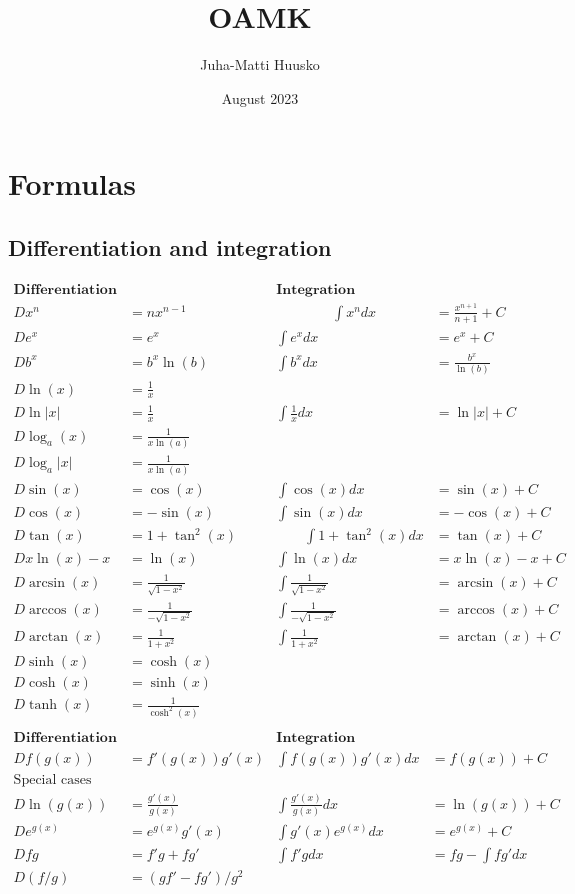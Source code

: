 \documentclass[12pt]{article}
\title{OAMK}
\author{Juha-Matti Huusko}
\date{August 2023}
\begin{document}
\thispagestyle{empty}

\section*{Formulas}
\subsection*{Differentiation and integration}

$$
\begin{array}{rl|rl}
\textbf{Differentiation} && \textbf{Integration}&\\[2mm]
Dx^n&=nx^{n-1}     \qquad\qquad&\qquad\qquad\int x^ndx&=\frac{x^{n+1}}{n+1}+C \\[2mm]
De^x&=e^x &\int e^xdx&=e^x+C\\[2mm]
Db^x&=b^x\ln(b) & \int b^xdx&=\frac{b^x}{\ln(b)}\\[2mm]
D\ln(x)&=\frac{1}{x} &&\\[2mm]
D\ln|x|&=\frac{1}{x} &\int\frac{1}{x}dx&=\ln|x|+C\\[2mm]
D\log_a(x)&=\frac{1}{x\ln(a)} &&\\[2mm]
D\log_a|x|&=\frac{1}{x\ln(a)} &&\\[2mm]
D\sin(x)&=\cos(x)   &\int\cos(x)dx&=\sin(x)+C\\[2mm]
D\cos(x)&=-\sin(x)  &\int\sin(x)dx&=-\cos(x)+C\\[2mm]
D\tan(x)&=1+\tan^2(x) \qquad&\qquad\int 1+\tan^2(x)dx&=\tan(x)+C\\[2mm]

Dx\ln(x)-x&=\ln(x) & \int\ln(x)dx&=x\ln(x)-x+C\\[10mm]

D\arcsin(x)&=\frac{1}{\sqrt{1-x^2}} & \int\frac{1}{\sqrt{1-x^2}}&=\arcsin(x)+C\\
D\arccos(x)&=\frac{1}{-\sqrt{1-x^2}} & \int\frac{1}{-\sqrt{1-x^2}}&=\arccos(x)+C\\
D\arctan(x)&=\frac{1}{1+x^2} & \int\frac{1}{1+x^2}&=\arctan(x)+C\\

D\sinh(x)&=\cosh(x) &&\\
D\cosh(x)&=\sinh(x) &&\\
D\tanh(x)&=\frac{1}{\cosh^2(x)} &&\\
\end{array}  
$$
\vspace{1cm}
$$
\begin{array}{rl|rl}
\textbf{Differentiation} && \textbf{Integration}&\\[2mm]
D f(g(x))&=f'(g(x))g'(x) & \int f(g(x))g'(x)dx&=f(g(x))+C\\[2mm]
\textrm{Special cases} &&&\\
D\ln(g(x))&=\frac{g'(x)}{g(x)} & \int \frac{g'(x)}{g(x)}dx&=\ln(g(x))+C\\[2mm]
D e^{g(x)}&=e^{g(x)}g'(x) & \int g'(x)e^{g(x)}dx&=e^{g(x)}+C\\[10mm]
D fg&=f'g+fg'& \int f'g dx&=fg-\int fg'dx\\[2mm]
D (f/g)&=(gf'-fg')/g^2 &&\\[2mm]
\end{array}  
$$
\end{document}
